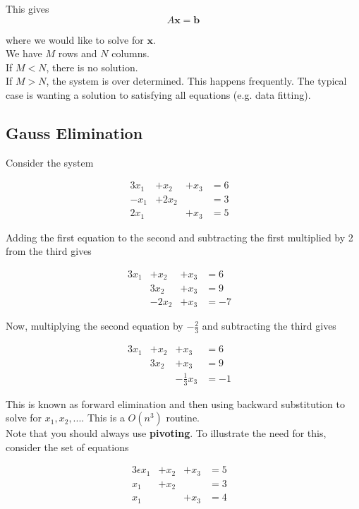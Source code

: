 \documentclass[]{article}
\begin{document}
This gives
\[A\bm{x}=\bm{b}\]

where we would like to solve for $\bm{x}$.\\

We have $M$ rows and $N$ columns.\\

If $M < N$, there is no solution.\\
If $M > N$,  the system is over determined. This happens frequently. The typical case is wanting a solution to satisfying all equations (e.g. data fitting).\\

\subsection{Gauss Elimination}\bigbreak

Consider the system

\begin{alignat*}{3}
	x_{1}& + x_{2}& + x_{3}& = 6&\\
	-x_{1}& + 2x_{2}& & = 3&\\
	2x_{1}& & + x_{3}& = 5&
\end{alignat*}

Adding the first equation to the second and subtracting the first multiplied by 2 from the third gives

\begin{alignat*}{3}
	x_{1}& + x_{2}& + x_{3}& = 6&\\
	& 3x_{2}& + x_{3}& = 9&\\
	&- 2x_{2}& + x_{3}& = -7&
\end{alignat*}

Now, multiplying the second equation by $-\frac{2}{3}$ and subtracting the third gives

\begin{alignat*}{3}
	x_{1}& + x_{2}& + x_{3}& = 6&\\
	&3x_{2}& + x_{3}& = 9&\\
	&& -\frac{1}{3}x_{3}& = -1&
\end{alignat*}

This is known as forward elimination and then using backward substitution to solve for $x_1, x_2, ...$. This is a $O(n^3)$ routine.\\

Note that you should always use \textbf{pivoting}. To illustrate the need for this, consider the set of equations

\begin{alignat*}{3}
	\epsilon x_{1}& + x_{2}& + x_{3}& = 5&\\
	x_{1}& + x_{2}& & = 3&\\
	x_{1}&  & + x_{3}& = 4&
\end{alignat*}
\end{document}
